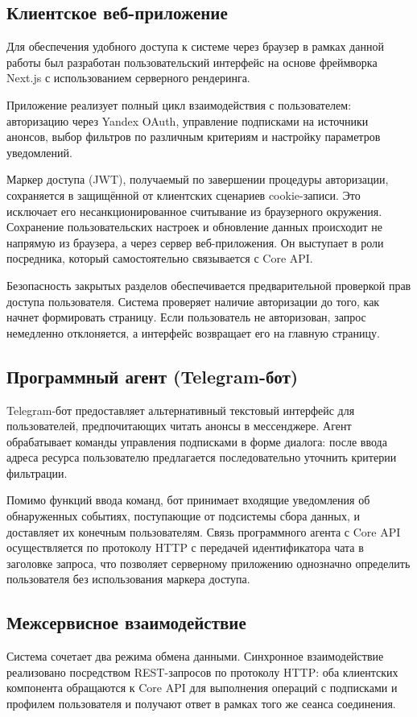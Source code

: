 \subsection*{Клиентское веб-приложение}
Для обеспечения удобного доступа к системе через браузер в рамках данной работы был разработан пользовательский интерфейс на основе фреймворка Next.js с использованием серверного рендеринга. 

Приложение реализует полный цикл взаимодействия с пользователем: авторизацию через Yandex OAuth, управление подписками на источники анонсов, выбор фильтров по различным критериям и настройку параметров уведомлений. 

Маркер доступа (JWT), получаемый по завершении процедуры авторизации, сохраняется в защищённой от клиентских сценариев cookie-записи.
Это исключает его несанкционированное считывание из браузерного окружения. 
Сохранение пользовательских настроек и обновление данных происходит не напрямую из браузера, а через сервер веб-приложения. 
Он выступает в роли посредника, который самостоятельно связывается с Core API.

Безопасность закрытых разделов обеспечивается предварительной проверкой прав доступа пользователя. 
Система проверяет наличие авторизации до того, как начнет формировать страницу. 
Если пользователь не авторизован, запрос немедленно отклоняется, а интерфейс возвращает его на главную страницу.

\subsection*{Программный агент (Telegram-бот)} 
Telegram-бот предоставляет альтернативный текстовый интерфейс для пользователей, предпочитающих читать анонсы в мессенджере. 
Агент обрабатывает команды управления подписками в форме диалога: после ввода адреса ресурса пользователю предлагается последовательно уточнить критерии фильтрации.

Помимо функций ввода команд, бот принимает входящие уведомления об обнаруженных событиях, поступающие от подсистемы сбора данных, и доставляет их конечным пользователям. 
Связь программного агента с Core API осуществляется по протоколу HTTP с передачей идентификатора чата в заголовке запроса, что позволяет серверному приложению однозначно определить пользователя без использования маркера доступа.

\subsection*{Межсервисное взаимодействие} 
Система сочетает два режима обмена данными. 
Синхронное взаимодействие реализовано посредством REST-запросов по протоколу HTTP: оба клиентских компонента обращаются к Core API для выполнения операций с подписками и профилем пользователя и получают ответ в рамках того же сеанса соединения. 

